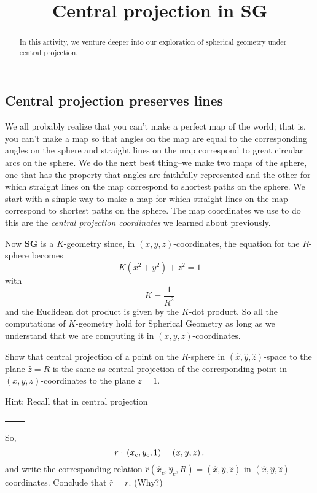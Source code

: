 \documentclass{ximera}
\title{Central projection in \textbf{SG}}
\begin{document}
\begin{abstract}
In this activity, we venture deeper into our exploration of spherical
geometry under central projection.
\end{abstract}
\maketitle

\subsection*{Central projection preserves lines}

We all probably realize that you can't make a perfect map of the world; that
is, you can't make a map so that angles on the map are equal to the
corresponding angles on the sphere and straight lines on the map correspond to
great circular arcs on the sphere. We do the next best thing--we make two maps
of the sphere, one that has the property that angles are faithfully
represented and the other for which straight lines on the map correspond to
shortest paths on the sphere. We start with a simple way to make a map for
which straight lines on the map correspond to shortest paths on the sphere.
The map coordinates we use to do this are the \textit{central projection
coordinates} we learned about previously.%

Now \textbf{SG} is a $K$-geometry %
since, in
$\left(  x,y,z\right)  $-coordinates, the equation for the $R$-sphere becomes%
\[
K\left(  x^{2}+y^{2}\right)  +z^{2}=1
\]
with%
\[
K=\frac{1}{R^{2}}%
\]
and the Euclidean dot product is given by the $K$-dot product. So all
the computations of $K$-geometry hold for Spherical Geometry as long
as we understand that we are computing it in $\left( x,y,z\right)
$-coordinates.

\begin{exercise}
Show that central projection of a point on the $R$-sphere in $\left(  \hat
{x},\hat{y},\hat{z}\right)  $-space to the plane $\hat{z}=R$ is the same as
central projection of the corresponding point in $\left(  x,y,z\right)
$-coordinates to the plane $z=1$.

Hint: Recall that in central projection

\begin{tabular}
[c]{cc}%
\includegraphics[
natheight=2.648100in,
natwidth=5.274500in,
height=1.3543in,
width=2.6852in
]%
{MXAJBZ0K.jpg}%
 &
\includegraphics[
natheight=3.472200in,
natwidth=5.736300in,
height=1.6345in,
width=2.6913in
]%
{MXAJBZ0L.jpg}%
\end{tabular}
So,%
\begin{equation}
r\text{\textperiodcentered}\left(  x_{c},y_{c},1\right)  =\left(
x,y,z\right).
\end{equation}
and write the corresponding relation $\hat{r}\left(
\hat{x}_{c},\hat{y}_{c},R\right) =\left( \hat{x},\hat
    {y},\hat{z}\right) $ in $\left( \hat{x},\hat{y},\hat{z}\right)
    $-coordinates. Conclude that $\hat{r}=r$. (Why?)
\end{exercise}
\end{document}
